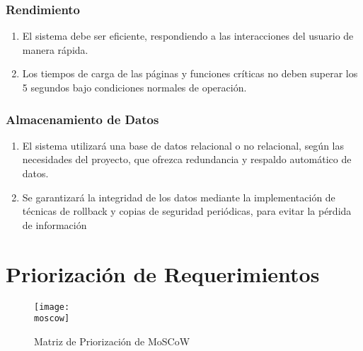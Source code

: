 	\subsubsection{Rendimiento}

	\begin{enumerate}
		\item El sistema debe ser eficiente, respondiendo a las interacciones del
			usuario de manera rápida.

		\item Los tiempos de carga de las páginas y funciones críticas no deben superar
			los 5 segundos bajo condiciones normales de operación.
	\end{enumerate}

	\subsubsection{Almacenamiento de Datos}

	\begin{enumerate}
		\item El sistema utilizará una base de datos relacional o no relacional, según las necesidades del proyecto, que ofrezca redundancia y respaldo automático de datos.

		\item Se garantizará la integridad de los datos mediante la implementación de técnicas de rollback y copias de seguridad periódicas, para evitar la pérdida de información
	\end{enumerate}

	\clearpage
	\section{Priorización de Requerimientos}

	\begin{figure}[h]
		\centering
		\texttt{[image: \\moscow]}
		\caption{Matriz de Priorización de MoSCoW}
	\end{figure}


